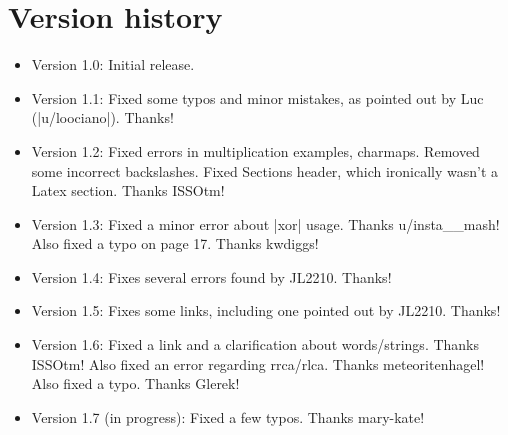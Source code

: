 \documentclass[11pt]{book}
\begin{document}
\chapter{Version history}
\begin{itemize}
\item Version 1.0: Initial release.
\item Version 1.1: Fixed some typos and minor mistakes, as pointed out by Luc (|u/loociano|). Thanks!
\item Version 1.2: Fixed errors in multiplication examples, charmaps. Removed some incorrect backslashes. Fixed Sections header, which ironically wasn't a Latex section. Thanks ISSOtm!
\item Version 1.3: Fixed a minor error about |xor| usage. Thanks u/insta\_\_mash! Also fixed a typo on page 17. Thanks kwdiggs!
\item Version 1.4: Fixes several errors found by JL2210. Thanks!
\item Version 1.5: Fixes some links, including one pointed out by JL2210. Thanks!
\item Version 1.6: Fixed a link and a clarification about words/strings. Thanks ISSOtm! Also fixed an error regarding rrca/rlca. Thanks meteoritenhagel! Also fixed a typo. Thanks Glerek!
\item Version 1.7 (in progress): Fixed a few typos. Thanks mary-kate!
\end{itemize}
\end{document}
